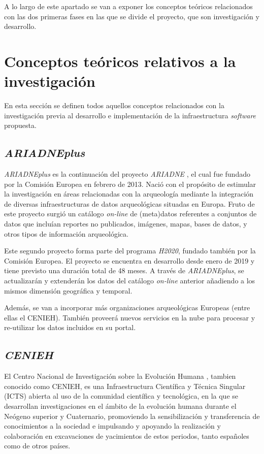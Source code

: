 
A lo largo de este apartado se van a exponer los conceptos teóricos
relacionados con las dos primeras fases en las que se divide el
proyecto, que son investigación y desarrollo.

\section{Conceptos teóricos relativos a la investigación}

En esta sección se definen todos aquellos conceptos relacionados con la
investigación previa al desarrollo e implementación de la
infraestructura \emph{software} propuesta.

\subsection{\emph{ARIADNEplus}}

\emph{ARIADNEplus} \cite{arip:web} es la continuación del
proyecto \emph{ARIADNE} \cite{ari:web}, el cual fue fundado
por la Comisión Europea en febrero de 2013. Nació con el propósito de
estimular la investigación en áreas relacionadas con la arqueología
mediante la integración de diversas infraestructuras de datos
arqueológicas situadas en Europa. Fruto de este proyecto surgió un
catálogo \emph{on-line} de (meta)datos referentes a conjuntos de datos
que incluían reportes no publicados, imágenes, mapas, bases de datos, y
otros tipos de información arqueológica.

Este segundo proyecto forma parte del programa \emph{H2020}, fundado
también por la Comisión Europea. El proyecto se encuentra en desarrollo
desde enero de 2019 y tiene previsto una duración total de 48 meses. A
través de \emph{ARIADNEplus}, se actualizarán y extenderán los datos del
catálogo \emph{on-line} anterior añadiendo a los mismos dimensión
geográfica y temporal. 

Además, se van a incorporar más organizaciones
arqueológicas Europeas (entre ellas el CENIEH). También proveerá nuevos
servicios en la nube para procesar y re-utilizar los datos incluidos en
su portal.

\subsection{\emph{CENIEH}}

El Centro Nacional de Investigación sobre la Evolución
Humana \cite{cenieh:web}, tambien conocido como
CENIEH, es una Infraestructura Científica y Técnica Singular (ICTS)
abierta al uso de la comunidad científica y tecnológica, en la que se
desarrollan investigaciones en el ámbito de la evolución humana durante
el Neógeno superior y Cuaternario, promoviendo la sensibilización y
transferencia de conocimientos a la sociedad e impulsando y apoyando la
realización y colaboración en excavaciones de yacimientos de estos
periodos, tanto españoles como de otros países.

